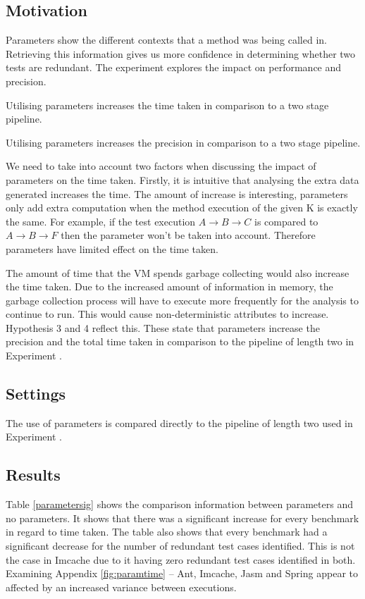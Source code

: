 \subsection{Motivation}
Parameters show the different contexts that a method was being called in. Retrieving this information gives us more confidence in determining whether two tests are redundant. The experiment explores the impact on performance and precision.

\begin{hyp}
Utilising parameters increases the time taken in comparison to a two stage pipeline.
\end{hyp}

\begin{hyp}
Utilising parameters increases the precision in comparison to a two stage pipeline.
\end{hyp}

We need to take into account two factors when discussing the impact of parameters on the time taken. Firstly, it is intuitive that analysing the extra data generated increases the time. The amount of increase is interesting, parameters only add extra computation when the method execution of the given K is exactly the same. For example, if the test execution $A \rightarrow  B \rightarrow  C$ is compared to $A \rightarrow  B \rightarrow  F$ then the parameter won't be taken into account. Therefore parameters have limited effect on the time taken. 

The amount of time that the VM spends garbage collecting would also increase the time taken. Due to the increased amount of information in memory, the garbage collection process will have to execute more frequently for the analysis to continue to run. This would cause non-deterministic attributes to increase. Hypothesis 3 and 4 reflect this. These state that parameters increase the precision and the total time taken in comparison to the pipeline of length two in Experiment .

\subsection{Settings}
The use of parameters is compared directly to the pipeline of length two used in Experiment .

\subsection{Results}
 Table \ref{parametersig} shows the comparison information between parameters and no parameters. It shows that there was a significant increase for every benchmark in regard to time taken. The table also shows that every benchmark had a significant decrease for the number of redundant test cases identified. This is not the case in Imcache due to it having zero redundant test cases identified in both. Examining Appendix \ref{fig:paramtime} -- Ant, Imcache, Jasm and Spring appear to affected by an increased variance between executions.
 

